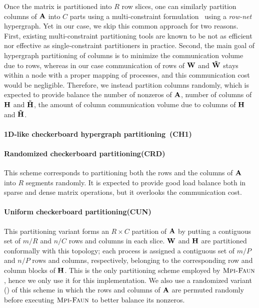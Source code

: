 Once the matrix is partitioned into $R$ row slices, one can similarly partition columns of $\mathbf{A}$ into $C$ parts using a multi-constraint formulation~\cite{aycu:08} using a \emph{row-net} hypergraph.
Yet in our case, we skip this common approach for two reasons.
First, existing multi-constraint partitioning tools are known to be not as efficient nor effective as single-constraint partitioners in practice.
Second, the main goal of hypergraph partitioning of columns is to minimize the communication volume due to rows, whereas in our case communication of rows of $\mathbf{W}$ and $\mathbf{\tilde{W}}$ stays within a node with a proper mapping of processes, and this communication cost would be negligible.
Therefore, we instead partition columns randomly, which is expected to provide balance the number of nonzeros of $\mathbf{A}$, number of columns of $\mathbf{H}$ and $\mathbf{\tilde{H}}$, the amount of column communication volume due to columns of $\mathbf{H}$ and $\mathbf{\tilde{H}}$.

\paragraph{1D-like checkerboard hypergraph partitioning~(\textbf{CH1})}

\paragraph{Randomized checkerboard partitioning(\textbf{CRD})}
This scheme corresponds to partitioning both the rows and the columns of $\mathbf{A}$ into $R$ segments randomly.
It is expected to provide good load balance both in sparse and dense matrix operations, but it overlooks the communication cost.

\paragraph{Uniform checkerboard partitioning(\textbf{CUN})}
This partitioning variant forms an $R \times C$ partition of $\mathbf{A}$ by putting a contiguous set of $m / R$ and $n / C$ rows and columns in each slice.
$\mathbf{W}$ and $\mathbf{H}$ are partitioned conformally with this topology; each process is assigned a contiguous set of  $m / P$ and $n / P$ rows and columns, respectively, belonging to the corresponding row and column blocks of $\mathbf{H}$.
This is the only partitioning scheme employed by $\textsc{Mpi-Faun}$ \cite{KBP16, KBP16MPIFAUN}, hence we only use it for this implementation.
We also use a randomized variant (\urp) of this scheme in which the rows and columns of $\mathbf{A}$ are permuted randomly before executing $\textsc{Mpi-Faun}$ to better balance its nonzeros.

